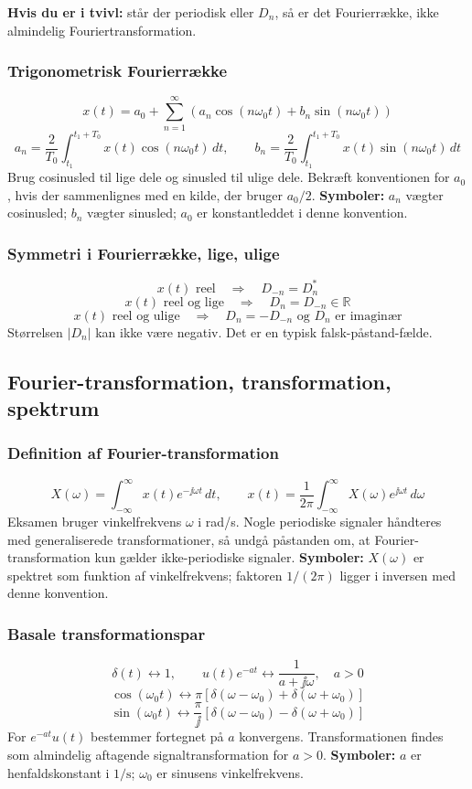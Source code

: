 \textbf{Hvis du er i tvivl:} står der periodisk eller \(D_n\), så er det Fourierrække, ikke almindelig Fouriertransformation.

\subsubsection{Trigonometrisk Fourierrække}
\[
x(t)=a_0+\sum_{n=1}^{\infty}\left(a_n\cos(n\omega_0t)+b_n\sin(n\omega_0t)\right)
\]
\[
a_n=\frac{2}{T_0}\int_{t_1}^{t_1+T_0}x(t)\cos(n\omega_0t)\,dt,\qquad
b_n=\frac{2}{T_0}\int_{t_1}^{t_1+T_0}x(t)\sin(n\omega_0t)\,dt
\]
Brug cosinusled til lige dele og sinusled til ulige dele. Bekræft konventionen for \(a_0\), hvis der sammenlignes med en kilde, der bruger \(a_0/2\).
\textbf{Symboler:} \(a_n\) vægter cosinusled; \(b_n\) vægter sinusled; \(a_0\) er konstantleddet i denne konvention.

\subsubsection{Symmetri i Fourierrække, lige, ulige}
\[
x(t)\text{ reel}\quad\Rightarrow\quad D_{-n}=D_n^*
\]
\[
x(t)\text{ reel og lige}\quad\Rightarrow\quad D_n=D_{-n}\in\mathbb{R}
\]
\[
x(t)\text{ reel og ulige}\quad\Rightarrow\quad D_n=-D_{-n}\text{ og }D_n\text{ er imaginær}
\]
Størrelsen \(|D_n|\) kan ikke være negativ. Det er en typisk falsk-påstand-fælde.

\subsection{Fourier-transformation, transformation, spektrum}

\subsubsection{Definition af Fourier-transformation}
\[
X(\omega)=\int_{-\infty}^{\infty}x(t)e^{-\jj\omega t}\,dt,\qquad
x(t)=\frac{1}{2\pi}\int_{-\infty}^{\infty}X(\omega)e^{\jj\omega t}\,d\omega
\]
Eksamen bruger vinkelfrekvens \(\omega\) i rad/s. Nogle periodiske signaler håndteres med generaliserede transformationer, så undgå påstanden om, at Fourier-transformation kun gælder ikke-periodiske signaler.
\textbf{Symboler:} \(X(\omega)\) er spektret som funktion af vinkelfrekvens; faktoren \(1/(2\pi)\) ligger i inversen med denne konvention.

\subsubsection{Basale transformationspar}
\[
\delta(t)\leftrightarrow 1,\qquad
u(t)e^{-at}\leftrightarrow \frac{1}{a+\jj\omega},\quad a>0
\]
\[
\cos(\omega_0t)\leftrightarrow \pi\left[\delta(\omega-\omega_0)+\delta(\omega+\omega_0)\right]
\]
\[
\sin(\omega_0t)\leftrightarrow \frac{\pi}{\jj}\left[\delta(\omega-\omega_0)-\delta(\omega+\omega_0)\right]
\]
For \(e^{-at}u(t)\) bestemmer fortegnet på \(a\) konvergens. Transformationen findes som almindelig aftagende signaltransformation for \(a>0\).
\textbf{Symboler:} \(a\) er henfaldskonstant i \(1/\mathrm{s}\); \(\omega_0\) er sinusens vinkelfrekvens.

